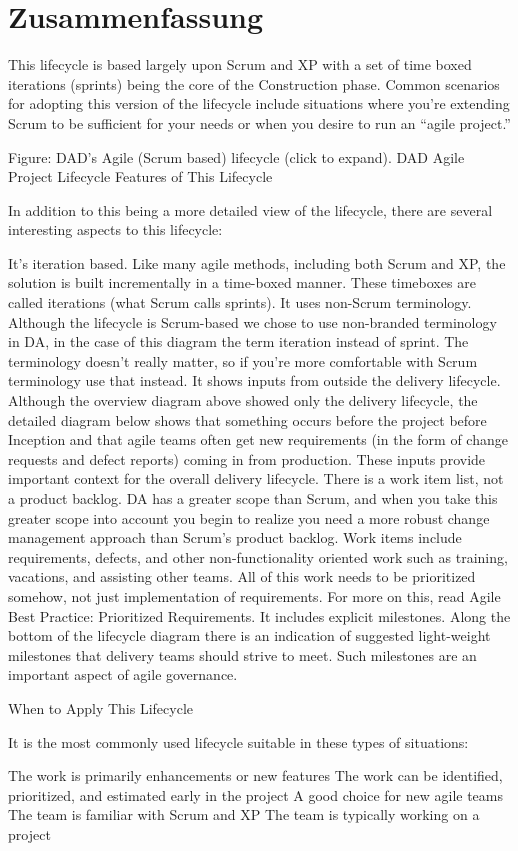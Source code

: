 \chapter*{Zusammenfassung}
\thispagestyle{fancy}


This lifecycle is based largely upon Scrum and XP with a set of time boxed iterations (sprints) being the core of the Construction phase.  Common scenarios for adopting this version of the lifecycle include situations where you’re extending Scrum to be sufficient for your needs or when you desire to run an “agile project.”

Figure: DAD’s Agile (Scrum based) lifecycle (click to expand).
DAD Agile Project Lifecycle
Features of This Lifecycle

In addition to this being a more detailed view of the lifecycle, there are several interesting aspects to this lifecycle:

    It’s iteration based. Like many agile methods, including both Scrum and XP, the solution is built incrementally in a time-boxed manner. These timeboxes are called iterations (what Scrum calls sprints).
    It uses non-Scrum terminology. Although the lifecycle is Scrum-based we chose to use non-branded terminology in DA, in the case of this diagram the term iteration instead of sprint. The terminology doesn’t really matter, so if you’re more comfortable with Scrum terminology use that instead.
    It shows inputs from outside the delivery lifecycle. Although the overview diagram above showed only the delivery lifecycle, the detailed diagram below shows that something occurs before the project before Inception and that agile teams often get new requirements (in the form of change requests and defect reports) coming in from production. These inputs provide important context for the overall delivery lifecycle.
    There is a work item list, not a product backlog. DA has a greater scope than Scrum, and when you take this greater scope into account you begin to realize you need a more robust change management approach than Scrum’s product backlog. Work items include requirements, defects, and other non-functionality oriented work such as training, vacations, and assisting other teams. All of this work needs to be prioritized somehow, not just implementation of requirements. For more on this, read Agile Best Practice: Prioritized Requirements.
    It includes explicit milestones. Along the bottom of the lifecycle diagram there is an indication of suggested light-weight milestones that delivery teams should strive to meet. Such milestones are an important aspect of agile governance.

When to Apply This Lifecycle

It is the most commonly used lifecycle suitable in these types of situations:

    The work is primarily enhancements or new features
    The work can be identified, prioritized, and estimated early in the project
    A good choice for new agile teams
    The team is familiar with Scrum and XP
    The team is typically working on a project

